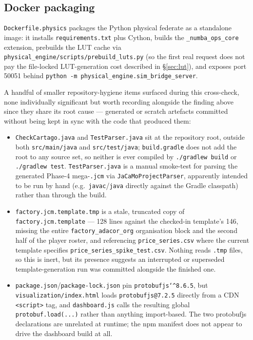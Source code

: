 \documentclass[twocolumn,10pt,a4paper]{article}
\newcommand{\code}[1]{\texttt{\small #1}}
\newcommand{\file}[1]{\texttt{#1}}
\begin{document}
\subsection{Docker packaging}
\label{sec:docker}
\file{Dockerfile.physics} packages the Python physical federate as a standalone image: it installs \file{requirements.txt} plus Cython, builds the \code{\_numba\_ops\_core} extension, prebuilds the LUT cache via \file{physical\_engine/scripts/prebuild\_luts.py} (so the first real request does not pay the file-locked LUT-generation cost described in \S\ref{sec:lut}), and exposes port 50051 behind \code{python -m physical\_engine.sim\_bridge\_server}.

\begin{notebox}
A handful of smaller repository-hygiene items surfaced during this cross-check, none individually significant but worth recording alongside the finding above since they share its root cause --- generated or scratch artefacts committed without being kept in sync with the code that produced them:
\begin{itemize}
\item \file{CheckCartago.java} and \file{TestParser.java} sit at the repository root, outside both \file{src/main/java} and \file{src/test/java}; \file{build.gradle} does not add the root to any source set, so neither is ever compiled by \code{./gradlew build} or \code{./gradlew test}. \file{TestParser.java} is a manual smoke-test for parsing the generated Phase-4 mega-\code{.jcm} via \code{JaCaMoProjectParser}, apparently intended to be run by hand (e.g.\ \code{javac}/\code{java} directly against the Gradle classpath) rather than through the build.
\item \file{factory.jcm.template.tmp} is a stale, truncated copy of \file{factory.jcm.template} --- 128 lines against the checked-in template's 146, missing the entire \code{factory\_adacor\_org} organisation block and the second half of the player roster, and referencing \code{price\_series.csv} where the current template specifies \code{price\_series\_spike\_test.csv}. Nothing reads \code{*.tmp} files, so this is inert, but its presence suggests an interrupted or superseded template-generation run was committed alongside the finished one.
\item \file{package.json}/\file{package-lock.json} pin \code{protobufjs\char`^8.6.5}, but \file{visualization/index.html} loads \code{protobufjs@7.2.5} directly from a CDN \code{<script>} tag, and \file{dashboard.js} calls the resulting global \code{protobuf.load(...)} rather than anything import-based. The two protobufjs declarations are unrelated at runtime; the npm manifest does not appear to drive the dashboard build at all.
\end{itemize}
\end{notebox}
\end{document}
